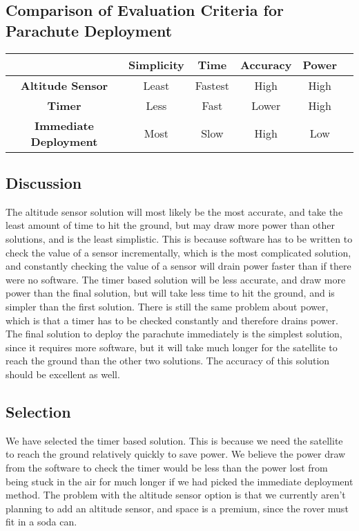 \documentclass[10pt,letterpaper,onecolumn,journal]{IEEEtran}
\begin{document}
\subsection*{Comparison of Evaluation Criteria for Parachute Deployment}
\begin{center}
  \begin{tabular}{cccccc}
    \hline
    \multicolumn{1}{l}{} & \textbf{Simplicity} & \textbf{Time}    & \textbf{Accuracy} & \textbf{Power}\\
    \hline
    \textbf{Altitude Sensor}      & Least      & Fastest & High     & High\\
    \hline
    \textbf{Timer}                & Less       & Fast    & Lower    & High\\
    \hline
    \textbf{Immediate Deployment} & Most       & Slow    & High     & Low\\
    \hline
  \end{tabular}
\end{center}
\vspace{.3cm}

\subsection{Discussion}
The altitude sensor solution will most likely be the most accurate, and take the least amount of time to hit the ground, but may draw more power than other solutions, and is the least simplistic. This is because software has to be written to check the value of a sensor incrementally, which is the most complicated solution, and constantly checking the value of a sensor will drain power faster than if there were no software. The timer based solution will be less accurate, and draw more power than the final solution, but will take less time to hit the ground, and is simpler than the first solution. There is still the same problem about power, which is that a timer has to be checked constantly and therefore drains power. The final solution to deploy the parachute immediately is the simplest solution, since it requires more software, but it will take much longer for the satellite to reach the ground than the other two solutions. The accuracy of this solution should be excellent as well.

\subsection{Selection}
We have selected the timer based solution. This is because we need the satellite to reach the ground relatively quickly to save power. We believe the power draw from the software to check the timer would be less than the power lost from being stuck in the air for much longer if we had picked the immediate deployment method. The problem with the altitude sensor option is that we currently aren’t planning to add an altitude sensor, and space is a premium, since the rover must fit in a soda can.
	
\end{document}
